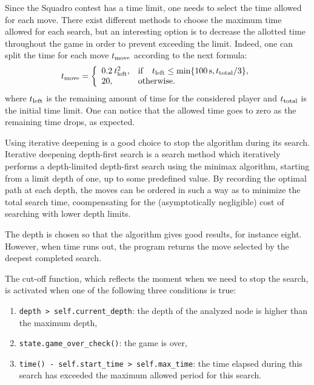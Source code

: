 \documentclass[journal,onecolumn]{IEEEtran}
\newcommand{\py}[1]{\texttt{#1}}
\begin{document}
Since the Squadro contest has a time limit, one needs to select the time allowed for each move.
There exist different methods to choose the maximum time allowed for each search, but an interesting option is to decrease the allotted time throughout the game in order to prevent exceeding the limit.
Indeed, one can split the time for each move $t_\textnormal{move}$ according to the next formula:
\[
    t_\textnormal{move} = 
    \left\{
    \begin{array}{ll}
      0.2 \: t_\textnormal{left}^2, & \mathrm{if}\quad t_\textnormal{left}\leq \min\{\SI{100}{s}, t_\textnormal{total}/3\}, \\
      20, & \mathrm{otherwise.} \\
    \end{array} 
    \right.
\]
where $t_\textnormal{left}$ is the remaining amount of time for the considered player and \(t_\textnormal{total}\) is the initial time limit.
One can notice that the allowed time goes to zero as the remaining time drops, as expected.

Using iterative deepening is a good choice to stop the algorithm during its search.
Iterative deepening depth-first search is a search method which iteratively performs a depth-limited depth-first search using the minimax algorithm, starting from a limit depth of one, up to some predefined value.
By recording the optimal path at each depth, the moves can be ordered in such a way as to minimize the total search time, coompensating for the (asymptotically negligible) cost of searching with lower depth limits.

The depth is chosen so that the algorithm gives good results, for instance eight.
However, when time runs out, the program returns the move selected by the deepest completed search.

The cut-off function, which reflects the moment when we need to stop the search, is activated when one of the following three conditions is true:
\begin{enumerate}
 \item \py{depth > self.current_depth}: the depth of the analyzed node is higher than the maximum depth,
 \item \py{state.game_over_check()}: the game is over,
 \item \py{time() - self.start_time > self.max_time}: the time elapsed during this search has exceeded the maximum allowed period for this search.
\end{enumerate}
\end{document}
